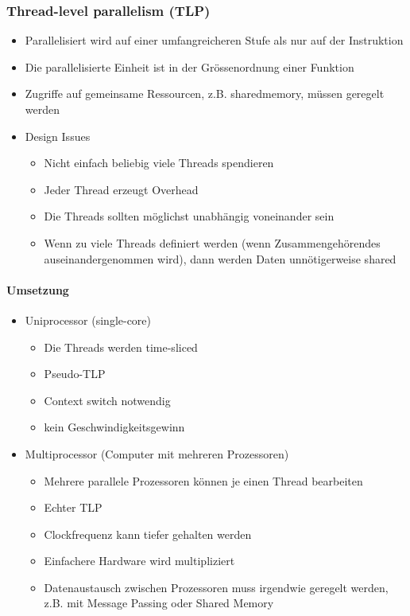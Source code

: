 \begin{multicols}{2}
\subsubsection{Thread-level parallelism (TLP)}
\begin{itemize}
	\item Parallelisiert wird auf einer umfangreicheren Stufe als nur auf der Instruktion
	\item Die parallelisierte Einheit ist in der Grössenordnung einer Funktion
	\item Zugriffe auf gemeinsame Ressourcen, z.B. sharedmemory, müssen geregelt werden
	\item Design Issues
	\begin{itemize}
		\item Nicht einfach beliebig viele Threads spendieren
		\item Jeder Thread erzeugt Overhead
		\item Die Threads sollten möglichst unabhängig voneinander sein
		\item Wenn zu viele Threads definiert werden (wenn Zusammengehörendes auseinandergenommen wird), dann werden Daten unnötigerweise shared
	\end{itemize}
\end{itemize}
\columnbreak
\paragraph{Umsetzung}
\begin{itemize}
	\item Uniprocessor (single-core)
	\begin{itemize}
		\item Die Threads werden time-sliced
		\item Pseudo-TLP
		\item Context switch notwendig
		\item kein Geschwindigkeitsgewinn
	\end{itemize}
	\item  Multiprocessor (Computer mit mehreren Prozessoren)
	\begin{itemize}
		\item Mehrere parallele Prozessoren können je einen Thread bearbeiten
		\item Echter TLP
		\item Clockfrequenz kann tiefer gehalten werden
		\item Einfachere Hardware wird multipliziert
		\item Datenaustausch zwischen Prozessoren muss irgendwie geregelt werden, z.B. mit Message Passing oder Shared Memory
	\end{itemize}
\end{itemize}
\end{multicols}
\newpage
